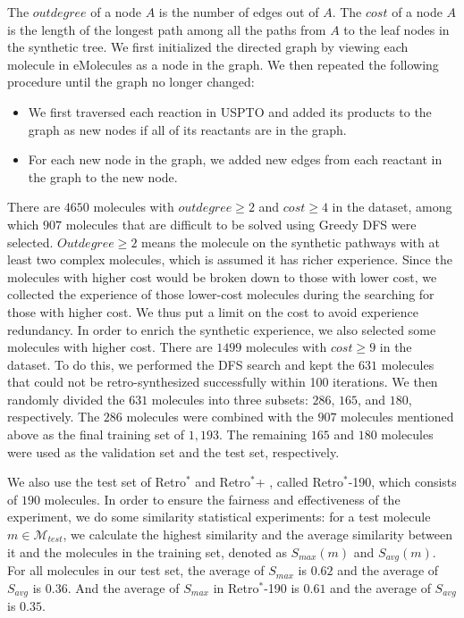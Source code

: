 \documentclass[sn-mathphys,Numbered]{sn-jnl}
\begin{document}
The $outdegree$ of a node $A$ is the number of edges out of $A$. 
The $cost$ of a node $A$ is the length of the longest path among all the paths from $A$ to the leaf nodes in the synthetic tree. 
We first initialized the directed graph by viewing each molecule in eMolecules as a node in the graph. We then repeated the following procedure until the graph no longer changed:
\begin{itemize}
    \item We first traversed each reaction in USPTO and added its products to the graph as new nodes if all of its reactants are in the graph.
    \item For each new node in the graph, we added new edges from each reactant in the graph to the new node. 
\end{itemize} 
There are $4650$ molecules with $outdegree \geq 2$ and $cost \geq 4$ in the dataset, among which $907$ molecules that are difficult to be solved using Greedy DFS were selected. $Outdegree \geq 2$ means the molecule on the synthetic pathways with at least two complex molecules, which is assumed it has richer experience. Since the molecules with higher cost would be broken down to those with lower cost, we collected the experience of those lower-cost molecules during the searching for those with higher cost. We thus put a limit on the cost to avoid experience redundancy. In order to enrich the synthetic experience, we also selected some molecules with higher cost. There are $1499$ molecules with $cost \geq 9$ in the dataset. To do this, we performed the DFS search and kept the $631$ molecules that could not be retro-synthesized successfully within 100 iterations. We then randomly divided the $631$ molecules into three subsets: $286$, $165$, and $180$, respectively. The $286$ molecules were combined with the $907$ molecules mentioned above as the final training set of $1,193$. The remaining $165$ and $180$ molecules were used as the validation set and the test set, respectively.

We also use the test set of Retro$^*$ \cite{retro2020} and Retro$^*$+ \cite{2022}, called Retro$^*$-190, which consists of $190$ 
molecules. In order to ensure the fairness and effectiveness of the experiment, we do some similarity statistical experiments: for a test molecule $m \in \mathcal{M}_{test}$, we calculate the highest similarity and the average similarity between it and the molecules in the training set, denoted as $S_{max}(m)$ and $S_{avg}(m)$. 
For all molecules in our test set, the average of $S_{max}$ is $0.62$ and the average of $S_{avg}$ is $0.36$. And the average of $S_{max}$ in Retro$^*$-190 is $0.61$ and the average of $S_{avg}$ is $0.35$.
\end{document}
